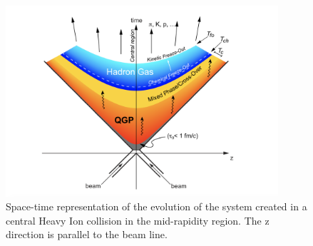 \begin{figure}
    \centering
    \includegraphics[width=0.9\textwidth]{gfx/evolution}
    \caption{Space-time representation of the evolution of the system created in a central Heavy Ion collision in the mid-rapidity region. The z direction is parallel to the beam line.}
	\label{fig:evolution}
\end{figure}

